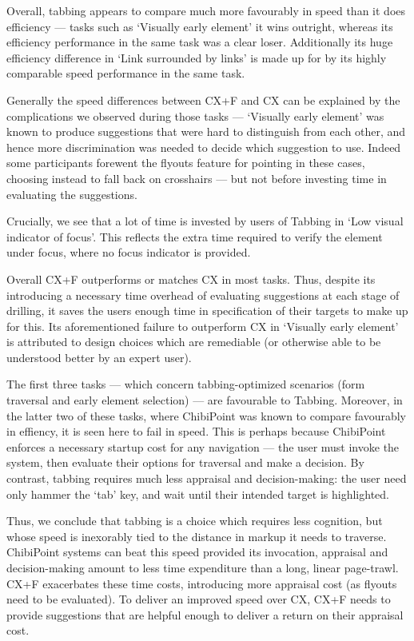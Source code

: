 \documentclass[11pt,openright,a4paper]{report}
\begin{document}
Overall, tabbing appears to compare much more favourably in speed than it does efficiency --- tasks such as `Visually early element' it wins outright, whereas its efficiency performance in the same task was a clear loser. Additionally its huge efficiency difference in `Link surrounded by links' is made up for by its highly comparable speed performance in the same task.

Generally the speed differences between CX+F and CX can be explained by the complications we observed during those tasks --- `Visually early element' was known to produce suggestions that were hard to distinguish from each other, and hence more discrimination was needed to decide which suggestion to use. Indeed some participants forewent the flyouts feature for pointing in these cases, choosing instead to fall back on crosshairs --- but not before investing time in evaluating the suggestions.

Crucially, we see that a lot of time is invested by users of Tabbing in `Low visual indicator of focus'. This reflects the extra time required to verify the element under focus, where no focus indicator is provided.

Overall CX+F outperforms or matches CX in most tasks. Thus, despite its introducing a necessary time overhead of evaluating suggestions at each stage of drilling, it saves the users enough time in specification of their targets to make up for this. Its aforementioned failure to outperform CX in `Visually early element' is attributed to design choices which are remediable (or otherwise able to be understood better by an expert user).

The first three tasks --- which concern tabbing-optimized scenarios (form traversal and early element selection) --- are favourable to Tabbing. Moreover, in the latter two of these tasks, where ChibiPoint was known to compare favourably in effiency, it is seen here to fail in speed. This is perhaps because ChibiPoint enforces a necessary startup cost for any navigation --- the user must invoke the system, then evaluate their options for traversal and make a decision. By contrast, tabbing requires much less appraisal and decision-making: the user need only hammer the `tab' key, and wait until their intended target is highlighted.

Thus, we conclude that tabbing is a choice which requires less cognition, but whose speed is inexorably tied to the distance in markup it needs to traverse. ChibiPoint systems can beat this speed provided its invocation, appraisal and decision-making amount to less time expenditure than a long, linear page-trawl. CX+F exacerbates these time costs, introducing more appraisal cost (as flyouts need to be evaluated). To deliver an improved speed over CX, CX+F needs to provide suggestions that are helpful enough to deliver a return on their appraisal cost.
\end{document}
